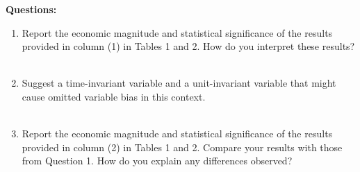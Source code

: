 \documentclass{article}
\begin{document}
\textbf{Questions:}
\begin{enumerate}
    \item Report the economic magnitude and statistical significance of the results provided in column (1) in Tables 1 and 2. How do you interpret these results?\\[1em]
\\[1em]

\newpage

    \item Suggest a time-invariant variable and a unit-invariant variable that might cause omitted variable bias in this context. \\[1em]
\\[1em]

    \item Report the economic magnitude and statistical significance of the results provided in column (2) in Tables 1 and 2. Compare your results with those from Question 1. How do you explain any differences observed? \\[1em]
\end{enumerate}
\end{document}
